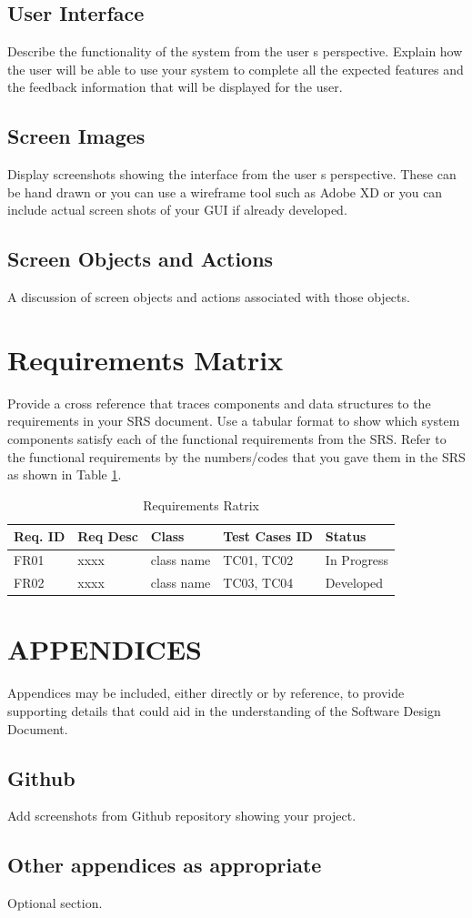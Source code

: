 \documentclass[12pt]{article}
\begin{document}
\subsection {User Interface}
Describe the functionality of the system from the user s perspective. Explain  how the user 
will be  able  to use  your system to complete  all the  expected  features and  the  feedback 
information that will be displayed for the user.

\subsection {Screen Images}
Display screenshots showing the interface from the user s perspective. These can be  hand drawn or you can use a wireframe tool such as Adobe XD or you can include actual screen shots of your GUI if already developed.

\subsection {Screen Objects and Actions}
A discussion of screen objects and actions associated with those objects.

\section{Requirements Matrix}
Provide a cross reference that traces components and data structures to the requirements in your SRS document.
Use  a  tabular  format to show  which system  components satisfy each of the  functional 
requirements from the SRS. Refer to the functional requirements by the numbers/codes that you gave them in the SRS as shown in Table \ref{tab:RM}.

\begin{table}[htbp]
\centering
\caption{Requirements Ratrix}
\label{tab:RM}
\begin{tabular}{|l|l|l|l|l|}
\hline
Req. ID  & Req Desc & Class & Test Cases ID & Status      \\ \hline
FR01     & xxxx     & class name & TC01, TC02    & In Progress \\ \hline
FR02     & xxxx     & class name & TC03, TC04    & Developed   \\ \hline
\end{tabular}
\end{table}

\section{APPENDICES}
Appendices may be included, either directly or by reference, to provide supporting details that could aid in the understanding of the Software Design Document.
\subsection{Github}
Add screenshots from Github repository showing your project.

\subsection{ Other appendices as appropriate}
Optional section.

\printbibliography
\end{document}
